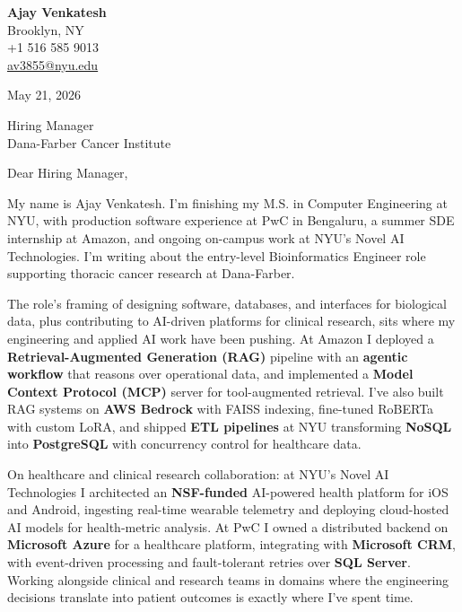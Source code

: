 \documentclass[letterpaper,11pt]{article}
\begin{document}
\begin{flushleft}
\textbf{\large Ajay Venkatesh} \\
Brooklyn, NY \\
+1 516 585 9013 \\
\href{mailto:av3855@nyu.edu}{av3855@nyu.edu}
\end{flushleft}
\vspace{10pt}
May 21, 2026
\vspace{6pt}

Hiring Manager \\
Dana-Farber Cancer Institute

\vspace{10pt}

Dear Hiring Manager,

My name is Ajay Venkatesh. I'm finishing my M.S. in Computer Engineering at NYU, with production software experience at PwC in Bengaluru, a summer SDE internship at Amazon, and ongoing on-campus work at NYU's Novel AI Technologies. I'm writing about the entry-level Bioinformatics Engineer role supporting thoracic cancer research at Dana-Farber.

The role's framing of designing software, databases, and interfaces for biological data, plus contributing to AI-driven platforms for clinical research, sits where my engineering and applied AI work have been pushing. At Amazon I deployed a \textbf{Retrieval-Augmented Generation (RAG)} pipeline with an \textbf{agentic workflow} that reasons over operational data, and implemented a \textbf{Model Context Protocol (MCP)} server for tool-augmented retrieval. I've also built RAG systems on \textbf{AWS Bedrock} with FAISS indexing, fine-tuned RoBERTa with custom LoRA, and shipped \textbf{ETL pipelines} at NYU transforming \textbf{NoSQL} into \textbf{PostgreSQL} with concurrency control for healthcare data.

On healthcare and clinical research collaboration: at NYU's Novel AI Technologies I architected an \textbf{NSF-funded} AI-powered health platform for iOS and Android, ingesting real-time wearable telemetry and deploying cloud-hosted AI models for health-metric analysis. At PwC I owned a distributed backend on \textbf{Microsoft Azure} for a healthcare platform, integrating with \textbf{Microsoft CRM}, with event-driven processing and fault-tolerant retries over \textbf{SQL Server}. Working alongside clinical and research teams in domains where the engineering decisions translate into patient outcomes is exactly where I've spent time.
\end{document}
